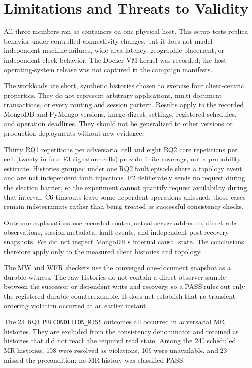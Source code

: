 \section{Limitations and Threats to Validity}

All three members ran as containers on one physical host. This setup tests
replica behavior under controlled connectivity changes, but it does not model
independent machine failures, wide-area latency, geographic placement, or
independent clock behavior. The Docker VM kernel was recorded; the host
operating-system release was not captured in the campaign manifests.

The workloads are short, synthetic histories chosen to exercise four
client-centric properties. They do not represent arbitrary applications,
multi-document transactions, or every routing and session pattern. Results
apply to the recorded MongoDB and PyMongo versions, image digest, settings,
registered schedules, and operation deadlines. They should not be generalized
to other versions or production deployments without new evidence.

Thirty RQ1 repetitions per adversarial cell and eight RQ2 core repetitions per
cell (twenty in four F3 signature cells) provide finite coverage, not a
probability estimate. Histories grouped under one RQ2 fault episode share a
topology event and are not independent fault injections. F2 deliberately sends
no request during the election barrier, so the experiment cannot quantify
request availability during that interval. C6 timeouts leave some dependent
operations unissued; those cases remain indeterminate rather than being
treated as successful consistency checks.

Outcome explanations use recorded routes, actual server addresses, direct role
observations, session metadata, fault events, and independent post-recovery
snapshots. We did not inspect MongoDB's internal causal state. The conclusions
therefore apply only to the measured client histories and topology.

The MW and WFR checkers use the converged one-document snapshot as a durable
witness. The raw histories do not contain a direct observer sample between the
successor or dependent write and recovery, so a PASS rules out only the
registered durable counterexample. It does not establish that no transient
ordering violation occurred at an earlier instant.

The 23 RQ1 \texttt{PRECONDITION\_MISS} outcomes all occurred in adversarial MR
histories. They are excluded from the consistency denominator and retained as
histories that did not reach the required read state. Among the 240 scheduled
MR histories, 108 were resolved as violations, 109 were unavailable, and 23
missed the precondition; no MR history was classified PASS.
